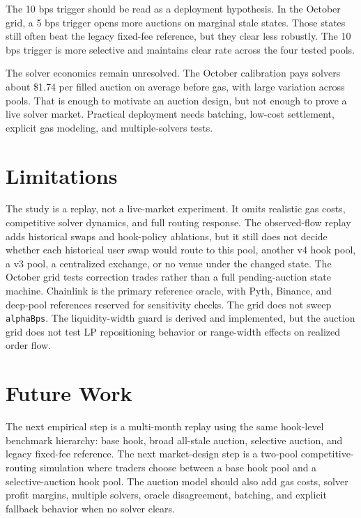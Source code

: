 \documentclass[11pt]{article}
\begin{document}
The 10 bps trigger should be read as a deployment hypothesis. In the October grid, a 5 bps trigger opens more auctions on marginal stale states. Those states still often beat the legacy fixed-fee reference, but they clear less robustly. The 10 bps trigger is more selective and maintains clear rate across the four tested pools.

The solver economics remain unresolved. The October calibration pays solvers about \$1.74 per filled auction on average before gas, with large variation across pools. That is enough to motivate an auction design, but not enough to prove a live solver market. Practical deployment needs batching, low-cost settlement, explicit gas modeling, and multiple-solvers tests.

\section{Limitations}
The study is a replay, not a live-market experiment. It omits realistic gas costs, competitive solver dynamics, and full routing response. The observed-flow replay adds historical swaps and hook-policy ablations, but it still does not decide whether each historical user swap would route to this pool, another v4 hook pool, a v3 pool, a centralized exchange, or no venue under the changed state. The October grid tests correction trades rather than a full pending-auction state machine. Chainlink is the primary reference oracle, with Pyth, Binance, and deep-pool references reserved for sensitivity checks. The grid does not sweep \texttt{alphaBps}. The liquidity-width guard is derived and implemented, but the auction grid does not test LP repositioning behavior or range-width effects on realized order flow.

\section{Future Work}
The next empirical step is a multi-month replay using the same hook-level benchmark hierarchy: base hook, broad all-stale auction, selective auction, and legacy fixed-fee reference. The next market-design step is a two-pool competitive-routing simulation where traders choose between a base hook pool and a selective-auction hook pool. The auction model should also add gas costs, solver profit margins, multiple solvers, oracle disagreement, batching, and explicit fallback behavior when no solver clears.
\end{document}
